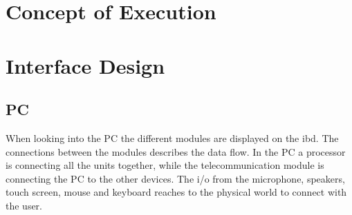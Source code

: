 \section{Concept of Execution}

\section{Interface Design}

\subsection{PC}
When looking into the PC the different modules are displayed on the ibd. The connections between the modules describes the data flow. In the PC a processor is connecting all the units together, while the telecommunication module is connecting the PC to the other devices. The i/o from the microphone, speakers, touch screen, mouse and keyboard reaches to the physical world to connect with the user.


